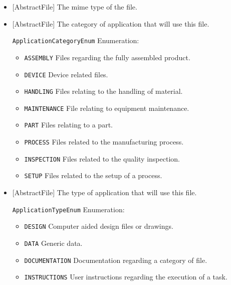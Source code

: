\begin{itemize}

\item {}[AbstractFile] \newline The mime type of the file.


\item {}[AbstractFile] \newline The category of application that will use this file.

\texttt{ApplicationCategoryEnum} Enumeration:

\begin{itemize}
\item \texttt{ASSEMBLY} \newline Files regarding the fully assembled product. 
\item \texttt{DEVICE} \newline Device related files. 
\item \texttt{HANDLING} \newline Files relating to the handling of material. 
\item \texttt{MAINTENANCE} \newline File relating to equipment maintenance. 
\item \texttt{PART} \newline Files relating to a part.
 
\item \texttt{PROCESS} \newline Files related to the manufacturing process. 
\item \texttt{INSPECTION} \newline Files related to the quality inspection. 
\item \texttt{SETUP} \newline Files related to the setup of a process. 
\end{itemize}


\item {}[AbstractFile] \newline The type of application that will use this file.

\texttt{ApplicationTypeEnum} Enumeration:

\begin{itemize}
\item \texttt{DESIGN} \newline Computer aided design files or drawings.
 
\item \texttt{DATA} \newline Generic data. 
\item \texttt{DOCUMENTATION} \newline Documentation regarding a category of file. 
\item \texttt{INSTRUCTIONS} \newline User instructions regarding the execution of a task.
 

\end{itemize}
\end{itemize}
